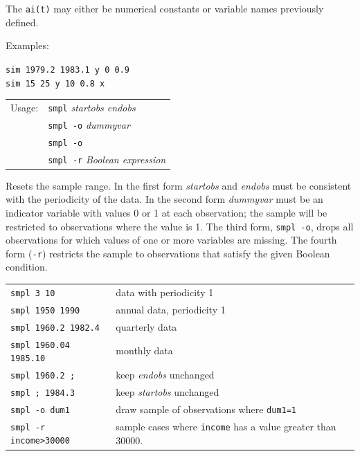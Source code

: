 \documentclass{article}
\begin{document}
{The \texttt{ai(t)} may either be numerical constants or variable names
previously defined.

Examples:

  \texttt{sim 1979.2 1983.1 y 0 0.9} \quad
  [generates \texttt{y(t) = 0.9*y(t-1)}] \\
  \texttt{sim 15 25 y 10 0.8 x}      \quad 
  [generates \texttt{y(t) = 10 + 0.8*y(t-1) + x(t)*y(t-2)}]


\begin{tabular}{ll}
Usage:  & \texttt{smpl} \textit{startobs endobs}\\
        & \texttt{smpl -o} \textit{dummyvar}\\
        & \texttt{smpl -o} \\
        & \texttt{smpl -r} \textit{Boolean expression}
\end{tabular}

Resets the sample range.  In the first form \textit{startobs} and
\textit{endobs} must be consistent with the periodicity of the data.
In the second form \textit{dummyvar} must be an indicator variable
with values 0 or 1 at each observation; the sample will be restricted
to observations where the value is 1.  The third form, \texttt{smpl
  -o}, drops all observations for which values of one or more
variables are missing.  The fourth form (\texttt{-r}) restricts the
sample to observations that satisfy the given Boolean condition.

\begin{tabular}{ll}
\texttt{smpl 3 10}                &
   data with periodicity 1\\
\texttt{smpl 1950 1990}           &
   annual data, periodicity 1\\ 
\texttt{smpl 1960.2 1982.4}       &
   quarterly data\\
\texttt{smpl 1960.04 1985.10}     &
   monthly data\\
\texttt{smpl 1960.2 ;}            &
   keep \textit{endobs} unchanged\\
\texttt{smpl ; 1984.3}            &
   keep \textit{startobs} unchanged\\
\texttt{smpl -o dum1}            &
   draw sample of observations where \texttt{dum1=1}\\
\texttt{smpl -r income>30000}    &
   sample cases where \texttt{income} has a 
      value greater than 30000.\\
\end{tabular}

}
\end{document}
